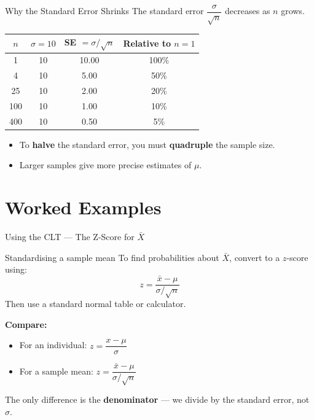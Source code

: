 \documentclass[aspectratio=169]{beamer}
\begin{document}
\begin{frame}{Why the Standard Error Shrinks}
    The standard error $\dfrac{\sigma}{\sqrt{n}}$ decreases as $n$ grows.
    \medskip

    \begin{center}
        \begin{tabular}{@{}cccc@{}}
            \toprule
            $n$ & $\sigma = 10$ & SE $= \sigma/\sqrt{n}$ & Relative to $n=1$ \\
            \midrule
            1   & 10            & 10.00                  & 100\%             \\
            4   & 10            & 5.00                   & 50\%              \\
            25  & 10            & 2.00                   & 20\%              \\
            100 & 10            & 1.00                   & 10\%              \\
            400 & 10            & 0.50                   & 5\%               \\
            \bottomrule
        \end{tabular}
    \end{center}
    \medskip
    \begin{itemize}
        \item To \textbf{halve} the standard error, you must \textbf{quadruple} the sample size.
        \item Larger samples give more precise estimates of $\mu$.
    \end{itemize}
\end{frame}

\section{Worked Examples}

\begin{frame}{Using the CLT --- The Z-Score for $\bar{X}$}
    \begin{block}{Standardising a sample mean}
        To find probabilities about $\bar{X}$, convert to a $z$-score using:
        \[
            z = \frac{\bar{x} - \mu}{\sigma / \sqrt{n}}
        \]
        Then use a standard normal table or calculator.
    \end{block}
    \medskip
    \textbf{Compare:}
    \begin{itemize}
        \item For an individual: $z = \dfrac{x - \mu}{\sigma}$
        \item For a sample mean: $z = \dfrac{\bar{x} - \mu}{\sigma / \sqrt{n}}$
    \end{itemize}
    \medskip
    The only difference is the \textbf{denominator} --- we divide by the standard error,
    not $\sigma$.
\end{frame}
\end{document}
